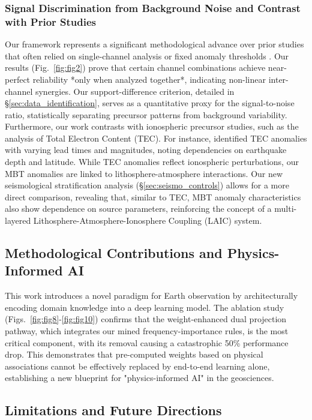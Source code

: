 \documentclass[preprint,review,12pt,authoryear]{elsarticle}
\begin{document}
\subsubsection{Signal Discrimination from Background Noise and Contrast with Prior Studies}
Our framework represents a significant methodological advance over prior studies that often relied on single-channel analysis or fixed anomaly thresholds \citep{wuIdentifyingSeismicAnomalies2024}. Our results (Fig.~\ref{fig:fig2}) prove that certain channel combinations achieve near-perfect reliability *only when analyzed together*, indicating non-linear inter-channel synergies. Our support-difference criterion, detailed in \S\ref{sec:data_identification}, serves as a quantitative proxy for the signal-to-noise ratio, statistically separating precursor patterns from background variability. Furthermore, our work contrasts with ionospheric precursor studies, such as the analysis of Total Electron Content (TEC). For instance, \citet{Shah2020TotalEC} identified TEC anomalies with varying lead times and magnitudes, noting dependencies on earthquake depth and latitude. While TEC anomalies reflect ionospheric perturbations, our MBT anomalies are linked to lithosphere-atmosphere interactions. Our new seismological stratification analysis (\S\ref{sec:seismo_controls}) allows for a more direct comparison, revealing that, similar to TEC, MBT anomaly characteristics also show dependence on source parameters, reinforcing the concept of a multi-layered Lithosphere-Atmosphere-Ionosphere Coupling (LAIC) system.

\subsection{Methodological Contributions and Physics-Informed AI}\label{sec:discuss_implications}

This work introduces a novel paradigm for Earth observation by architecturally encoding domain knowledge into a deep learning model. The ablation study (Figs.~\ref{fig:fig8}-\ref{fig:fig10}) confirms that the weight-enhanced dual projection pathway, which integrates our mined frequency-importance rules, is the most critical component, with its removal causing a catastrophic 50\% performance drop. This demonstrates that pre-computed weights based on physical associations cannot be effectively replaced by end-to-end learning alone, establishing a new blueprint for "physics-informed AI" in the geosciences.

\subsection{Limitations and Future Directions}\label{sec:discuss_limitations}
\end{document}
